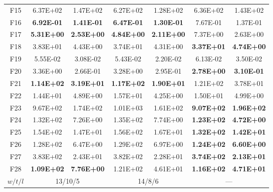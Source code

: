 \begin{table*}[!ht]
\begin{tabular}{|c|cc|cc|cc|}
    F15   & 6.37E+02 & 1.47E+02 & 6.27E+02 & 1.28E+02 & 6.36E+02 & 1.43E+02 \\
    F16   & \textbf{6.92E-01} & \textbf{1.41E-01} & \textbf{6.47E-01} & \textbf{1.30E-01} & 7.67E-01 & 1.37E-01 \\
    F17   & \textbf{5.31E+00} & \textbf{2.53E+00} & \textbf{4.84E+00} & \textbf{2.11E+00} & 7.37E+00 & 2.63E+00 \\
    F18   & 3.83E+01 & 4.43E+00 & 3.74E+01 & 4.31E+00 & \textbf{3.37E+01} & \textbf{4.74E+00} \\
    F19   & 5.55E-02 & 3.08E-02 & 5.43E-02 & 2.20E-02 & 6.13E-02 & 3.50E-02 \\
    F20   & 3.36E+00 & 2.66E-01 & 3.28E+00 & 2.95E-01 & \textbf{2.78E+00} & \textbf{3.10E-01} \\
    \hline
    F21   & \textbf{1.14E+02} & \textbf{3.19E+01} & \textbf{1.17E+02} & \textbf{1.90E+01} & 1.21E+02 & 3.78E+01 \\
    F22   & 1.44E+01 & 4.89E+00 & 1.57E+01 & 4.25E+00 & 1.50E+01 & 4.99E+00 \\
    F23   & 9.67E+02 & 1.74E+02 & 1.01E+03 & 1.61E+02 & \textbf{9.07E+02} & \textbf{1.96E+02} \\
    F24   & 1.32E+02 & 7.26E+00 & 1.35E+02 & 7.74E+00 & \textbf{1.23E+02} & \textbf{4.72E+00} \\
    F25   & 1.54E+02 & 1.47E+01 & 1.56E+02 & 1.67E+01 & \textbf{1.32E+02} & \textbf{1.42E+01} \\
    F26   & 1.28E+02 & 6.47E+00 & 1.29E+02 & 6.97E+00 & \textbf{1.24E+02} & \textbf{6.60E+00} \\
    F27   & 3.83E+02 & 2.43E+01 & 3.82E+02 & 2.28E+01 & \textbf{3.74E+02} & \textbf{2.13E+01} \\
    F28   & \textbf{1.09E+02} & \textbf{7.76E+00} & 1.21E+02 & 4.61E+01 & \textbf{1.16E+02} & \textbf{4.71E+01} \\
    \hline
    $w/t/l$ & \multicolumn{2}{c|}{13/10/5} & \multicolumn{2}{c|}{14/8/6} & \multicolumn{2}{c|}{---} \\
    \hline
    \end{tabular}%
  \label{tab:AG_CEC13_origin10D}%
\end{table*}%

